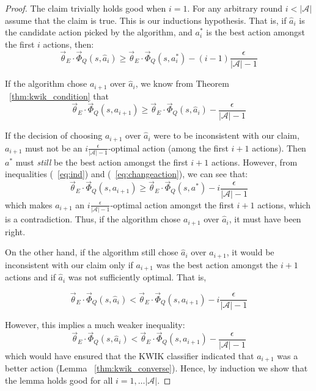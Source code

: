 \begin{proof}
The claim trivially holds good when $i=1$. 
For any arbitrary round $i < |\mathcal{A}|$ assume that the claim is true. This is our inductions hypothesis. That is, if $\hat{a}_i$ is the candidate action picked by the algorithm, and $a_i^*$ is the best action amongst the first $i$ actions, then:
\begin{equation}\label{eq:ind}
\vec{\theta}_E\cdot \vec{\Phi}_Q(s,\hat{a}_i) \geq \vec{\theta}_E\cdot \vec{\Phi}_Q(s,a_i^*) - (i-1)\frac{\epsilon}{|\mathcal{A}|-1} 
\end{equation}

If the algorithm chose $a_{i+1}$ over $\hat{a}_i$, we know from Theorem ~\ref{thm:kwik_condition}  that
\begin{equation}\label{eq:changeaction}
\vec{\theta}_E\cdot \vec{\Phi}_Q(s,a_{i+1}) \geq \vec{\theta}_E\cdot \vec{\Phi}_Q(s,\hat{a}_i) - \frac{\epsilon}{|\mathcal{A}|-1}
\end{equation}


If the decision of choosing $a_{i+1}$ over $\hat{a}_i$ were to be inconsistent with our claim, $a_{i+1}$ must not be an $i \frac{\epsilon}{|\mathcal{A}|-1}$-optimal action (among the first $i+1$ actions). Then $a^*$ must \textit{still} be the best action amongst the first $i+1$ actions. However, from inequalities (~\ref{eq:ind}) and (~\ref{eq:changeaction}), we can see that:
\[
\vec{\theta}_E\cdot \vec{\Phi}_Q(s,{a}_{i+1}) \geq \vec{\theta}_E\cdot \vec{\Phi}_Q(s,a^*) - i\frac{\epsilon}{|\mathcal{A}|-1}
\]
which makes $a_{i+1}$ an $i \frac{\epsilon}{|\mathcal{A}|-1}$-optimal action amongst the first $i+1$ actions, which is a contradiction. Thus, if the algorithm chose  $a_{i+1}$ over $\hat{a}_i$, it must have been right.

On the other hand, if the algorithm still chose $\hat{a}_i$ over $a_{i+1}$, it would be inconsistent with our claim only if $a_{i+1}$ was the best action amongst the $i+1$ actions and if $\hat{a}_i$ was not sufficiently optimal. That is,

\begin{equation}\label{eq:notoptimal}
\vec{\theta}_E\cdot \vec{\Phi}_Q(s,\hat{a}_{i}) < \vec{\theta}_E\cdot \vec{\Phi}_Q(s,a_{i+1}) - i\frac{\epsilon}{|\mathcal{A}|-1}
\end{equation}

However, this implies a much weaker inequality:
\[
\vec{\theta}_E\cdot \vec{\Phi}_Q(s,\hat{a}_{i}) < \vec{\theta}_E\cdot \vec{\Phi}_Q(s,a_{i+1}) - \frac{\epsilon}{|\mathcal{A}|-1}
\]
which would have ensured that the KWIK classifier indicated that $a_{i+1}$
was a better action (Lemma ~\ref{thm:kwik_converse}). Hence, by induction we show that the lemma holds good for all $i = 1, \hdots |\mathcal{A}|$. 

\end{proof}

